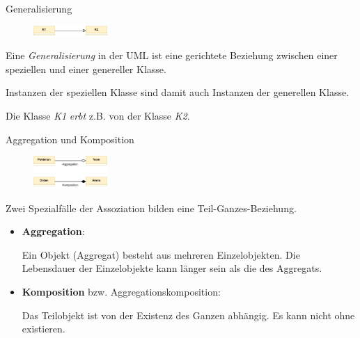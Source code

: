 \begin{diag}{Generalisierung}
    \begin{figure}
        \centering
        \includegraphics[width=0.25\textwidth]{includes/figures/defi_diagrams_class_vererbung.pdf}
    \end{figure}
    Eine \emph{Generalisierung} in der UML ist eine gerichtete Beziehung zwischen einer speziellen und einer genereller Klasse.

    Instanzen der speziellen Klasse sind damit auch Instanzen der generellen Klasse.

    Die Klasse \emph{K1} \emph{erbt} z.B. von der Klasse \emph{K2}.
\end{diag}

\begin{diag}{Aggregation und Komposition}
    \begin{figure}
        \centering
        \includegraphics[width=0.25\textwidth]{includes/figures/defi_diagrams_class_aggregation_composition.pdf}
    \end{figure}
    Zwei Spezialfälle der Assoziation bilden eine Teil-Ganzes-Beziehung.

    \begin{itemize}
        \item \textbf{Aggregation}:

              Ein Objekt (Aggregat) besteht aus mehreren Einzelobjekten.
              Die Lebensdauer der Einzelobjekte kann länger sein als die des Aggregats.
        \item \textbf{Komposition} bzw. Aggregationskomposition:

              Das Teilobjekt ist von der Existenz des Ganzen abhängig.
              Es kann nicht ohne existieren.
    \end{itemize}
\end{diag}

